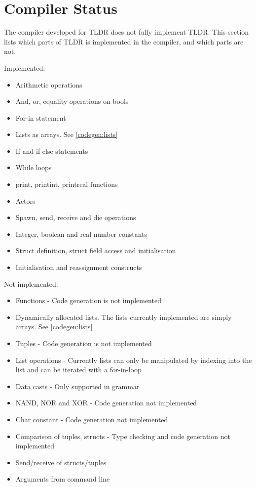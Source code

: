 \section{Compiler Status}\label{sec:compilerStatus}

The compiler developed for TLDR does not fully implement TLDR. This section lists which parts of TLDR is implemented in the compiler, and which parts are not.


Implemented:

\begin{itemize}
\item Arithmetic operations
\item And, or, equality operations on bools
\item For-in statement
\item Lists as arrays. See \cref{codegen:lists}
\item If and if-else statements
\item While loops
\item print, printint, printreal functions
\item Actors
\item Spawn, send, receive and die operations
\item Integer, boolean and real number constants
\item Struct definition, struct field access and initialisation
\item Initialisation and reassignment constructs
\end{itemize}

Not implemented:

\begin{itemize}
\item Functions - Code generation is not implemented
\item Dynamically allocated lists. The lists currently implemented are simply arrays. See \cref{codegen:lists}
\item Tuples - Code generation is not implemented
\item List operations - Currently lists can only be manipulated by indexing into the list and can be iterated with a for-in-loop
\item Data casts - Only supported in grammar
\item NAND, NOR and XOR - Code generation not implemented
\item Char constant - Code generation not implemented
\item Comparison of tuples, structs - Type checking and code generation not implemented
\item Send/receive of structs/tuples
\item Arguments from command line
\end{itemize}